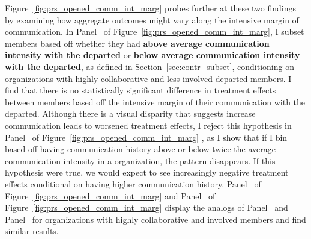 \documentclass[12pt,notitlepage]{article}
\begin{document}
Figure~\ref{fig:prs_opened_comm_int_marg} probes further at these two findings by examining how aggregate outcomes might vary along the intensive margin of communication. In Panel~ of Figure~\ref{fig:prs_opened_comm_int_marg}, I subset members based off whether they had \textbf{above average communication intensity with the departed} or \textbf{below average communication intensity with the departed}, as defined in Section~\ref{sec:contr_subset}, conditioning on organizations with highly collaborative and less involved departed members. I find that there is no statistically significant difference in treatment effects between members based off the intensive margin of their communication with the departed. Although there is a visual disparity that suggests increase communication leads to worsened treatment effects, I reject this hypothesis in Panel~ of Figure~\ref{fig:prs_opened_comm_int_marg} , as I show that if I bin based off having communication history above or below twice the average communication intensity in a organization, the pattern disappears. If this hypothesis were true, we would expect to see increasingly negative treatment effects conditional on having higher communication history. Panel~ of Figure~\ref{fig:prs_opened_comm_int_marg} and Panel~ of Figure~\ref{fig:prs_opened_comm_int_marg}  display the analogs of Panel~ and Panel~ for organizations with highly collaborative and involved members and find similar results. 
\end{document}
